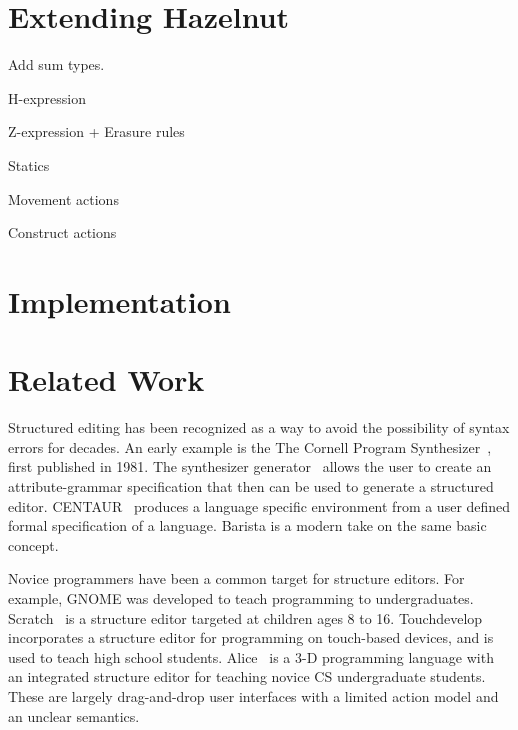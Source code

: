 \documentclass[preprint,9pt]{sigplanconf}
\begin{document}
% 


\section{Extending Hazelnut}\label{sec:extending}
 Add sum types.

H-expression

Z-expression + Erasure rules

Statics

Movement actions

Construct actions



\section{Implementation}
\label{sec:impl}


\section{Related Work}\label{sec:rw}


Structured editing has been recognized as a way to avoid the possibility of syntax errors for decades.  An early example is the
The Cornell Program Synthesizer~\cite{teitelbaum_cornell_1981}, first published in 1981.
The synthesizer generator~\cite{Reps:1984:SG:390010.808247} allows the user to create an attribute-grammar specification that then can be used to generate a structured editor.
CENTAUR~\cite{Borras:1988:CS:64140.65005} produces a language specific environment from a user defined formal specification of a language. Barista \cite{ko_barista:_2006} is a modern take on the same basic concept.%

Novice programmers have been a common target for structure editors. For example,
GNOME\cite{garlan_gnome:_1984} was developed to teach programming to undergraduates.
Scratch~\cite{Resnick:2009:SP:1592761.1592779} is a structure editor targeted at children ages 8 to 16.
Touchdevelop \cite{tillmann_touchdevelop:_2011} incorporates a structure editor for programming on touch-based devices, and is used to teach high school students.
Alice~\cite{Conway:2000:ALL:332040.332481} is a 3-D programming language with an integrated structure editor for teaching novice CS undergraduate students. These are largely drag-and-drop user interfaces with a limited action model and an unclear semantics.
\end{document}

